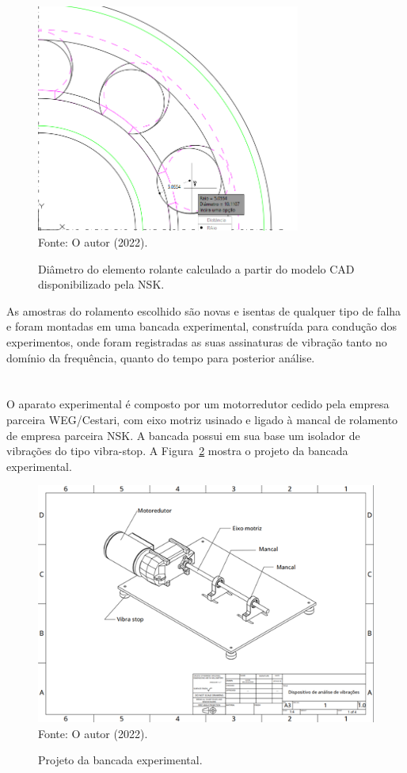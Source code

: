 \documentclass[
	12pt,				
	oneside,			
	a4paper,			
	english,			
	brazil,			
	]{abntex2ppgsi}
\begin{document}
\begin{figure}[H]
\centering
\caption {Diâmetro do elemento rolante calculado a partir do modelo CAD disponibilizado pela NSK.}
\includegraphics[width=\textwidth,height=75mm,keepaspectratio]{diametro_rolamento} \\
Fonte: O autor (2022).
\label{diametro_rolamento}
\end{figure} 

As amostras do rolamento escolhido são novas e isentas de qualquer tipo de falha e foram montadas em uma bancada experimental, construída para condução dos experimentos, onde foram registradas as suas assinaturas de vibração tanto no domínio da frequência, quanto do tempo para posterior análise. 

\section{}

O aparato experimental é composto por um motorredutor cedido pela empresa parceira WEG/Cestari, com eixo motriz usinado e ligado à mancal de rolamento de empresa parceira NSK. A bancada possui em sua base um isolador de vibrações do tipo vibra-stop. A Figura~\ref{Figura22} mostra o projeto da bancada experimental. 

\begin{figure}[H]
\centering
\caption {Projeto da bancada experimental.}
\includegraphics[width=\textwidth,height=\textheight,keepaspectratio]{Figura22} \\
Fonte: O autor (2022).
\label{Figura22}
\end{figure}
\end{document}
